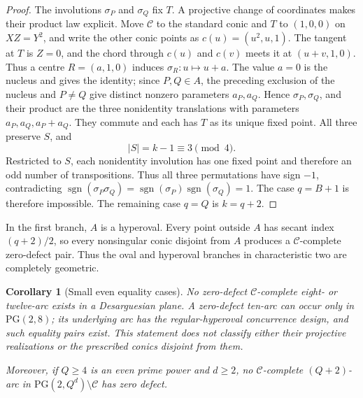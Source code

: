 \documentclass[11pt]{article}
\newtheorem{corollary}[theorem]{Corollary}
\theoremstyle{definition}
\theoremstyle{remark}
\newcommand{\PG}{\mathrm{PG}}
\newcommand{\cC}{\mathcal{C}}
\begin{document}
\begin{proof}
The involutions \(\sigma_P\) and \(\sigma_Q\) fix \(T\).  A projective
change of coordinates makes their product law explicit.  Move \(\cC\) to
the standard conic and \(T\) to
\((1,0,0)\) on \(XZ=Y^2\), and write the other conic points as
\(c(u)=(u^2,u,1)\).  The tangent at \(T\) is \(Z=0\), and the chord through
\(c(u)\) and \(c(v)\) meets it at
\((u+v,1,0)\).  Thus a centre \(R=(a,1,0)\) induces
\(\sigma_R:u\mapsto u+a\).  The value \(a=0\) is the nucleus and gives the
identity; since \(P,Q\in A\), the preceding exclusion of the nucleus and
\(P\ne Q\) give distinct nonzero parameters \(a_P,a_Q\).  Hence
\(\sigma_P,\sigma_Q\), and their product are the three nonidentity
translations with parameters \(a_P,a_Q,a_P+a_Q\).  They commute and each
has \(T\) as its unique fixed point.  All three preserve \(S\), and
\[
 |S|=k-1\equiv3\pmod4.
\]
Restricted to \(S\), each nonidentity involution has one fixed point and
therefore an odd number of transpositions.  Thus all three permutations
have sign \(-1\), contradicting
\(\operatorname{sgn}(\sigma_P\sigma_Q)
=\operatorname{sgn}(\sigma_P)\operatorname{sgn}(\sigma_Q)=1\).
The case \(q=B+1\) is therefore impossible.  The remaining case \(q=Q\)
is \(k=q+2\).
\end{proof}

In the first branch, $A$ is a hyperoval.  Every point outside $A$ has
secant index $(q+2)/2$, so every nonsingular conic disjoint from $A$
produces a $\cC$-complete zero-defect pair.  Thus the oval and hyperoval
branches in characteristic two are completely geometric.

\begin{corollary}[Small even equality cases]
\label{cor:small-even-equality}
No zero-defect \(\cC\)-complete eight- or twelve-arc exists in a
Desarguesian plane.  A zero-defect ten-arc can occur only in
\(\PG(2,8)\); its underlying arc has the regular-hyperoval concurrence
design, and such equality pairs exist.  This statement does not classify
either their projective realizations or the prescribed conics disjoint
from them.

Moreover, if \(Q\ge4\) is an even prime power and \(d\ge2\), no
\(\cC\)-complete \((Q+2)\)-arc in
\(\PG(2,Q^d)\setminus\cC\) has zero defect.
\end{corollary}
\end{document}
